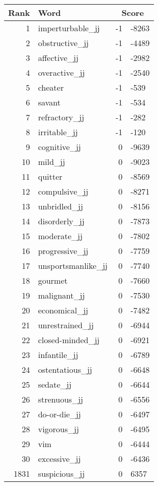 \begin{longtable}[!htbp]{| rlr@{.}l |}
    \hline
    \textbf{Rank} & \textbf{Word} & \multicolumn{2}{c|}{\textbf{Score}} \\
    \hline
    \endhead
    1 & imperturbable\_jj & -1 & -8263 \\
    2 & obstructive\_jj & -1 & -4489 \\
    3 & affective\_jj & -1 & -2982 \\
    4 & overactive\_jj & -1 & -2540 \\
    5 & cheater & -1 & -539 \\
    6 & savant & -1 & -534 \\
    7 & refractory\_jj & -1 & -282 \\
    8 & irritable\_jj & -1 & -120 \\
    9 & cognitive\_jj & 0 & -9639 \\
    10 & mild\_jj & 0 & -9023 \\
    11 & quitter & 0 & -8569 \\
    12 & compulsive\_jj & 0 & -8271 \\
    13 & unbridled\_jj & 0 & -8156 \\
    14 & disorderly\_jj & 0 & -7873 \\
    15 & moderate\_jj & 0 & -7802 \\
    16 & progressive\_jj & 0 & -7759 \\
    17 & unsportsmanlike\_jj & 0 & -7740 \\
    18 & gourmet & 0 & -7660 \\
    19 & malignant\_jj & 0 & -7530 \\
    20 & economical\_jj & 0 & -7482 \\
    21 & unrestrained\_jj & 0 & -6944 \\
    22 & closed-minded\_jj & 0 & -6921 \\
    23 & infantile\_jj & 0 & -6789 \\
    24 & ostentatious\_jj & 0 & -6648 \\
    25 & sedate\_jj & 0 & -6644 \\
    26 & strenuous\_jj & 0 & -6556 \\
    27 & do-or-die\_jj & 0 & -6497 \\
    28 & vigorous\_jj & 0 & -6495 \\
    29 & vim & 0 & -6444 \\
    30 & excessive\_jj & 0 & -6436 \\
    1831 & suspicious\_jj & 0 & 6357 \\

\end{longtable}
